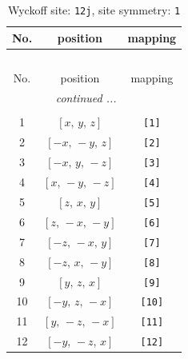 \documentclass[fleqn,8pt]{jsarticle}
\begin{document}
\begin{longtable}{ccc}
\caption{Wyckoff site: {\tt 12j}, site symmetry: {\tt 1}}
 \\
 \hline \hline
No. & position & mapping \\ \hline \endfirsthead

\multicolumn{2}{l}{\tablename\ \thetable{}} \\
 \hline \hline
No. & position & mapping \\ \hline \endhead

 \hline \hline
\multicolumn{2}{r}{\footnotesize\it continued ...} \\ \endfoot

 \hline \hline
\multicolumn{2}{r}{} \\ \endlastfoot

1 & $\left[ x,\, y,\, z \right]$ & {\tt [1]} \\ \hline
2 & $\left[ - x,\, - y,\, z \right]$ & {\tt [2]} \\ \hline
3 & $\left[ - x,\, y,\, - z \right]$ & {\tt [3]} \\ \hline
4 & $\left[ x,\, - y,\, - z \right]$ & {\tt [4]} \\ \hline
5 & $\left[ z,\, x,\, y \right]$ & {\tt [5]} \\ \hline
6 & $\left[ z,\, - x,\, - y \right]$ & {\tt [6]} \\ \hline
7 & $\left[ - z,\, - x,\, y \right]$ & {\tt [7]} \\ \hline
8 & $\left[ - z,\, x,\, - y \right]$ & {\tt [8]} \\ \hline
9 & $\left[ y,\, z,\, x \right]$ & {\tt [9]} \\ \hline
10 & $\left[ - y,\, z,\, - x \right]$ & {\tt [10]} \\ \hline
11 & $\left[ y,\, - z,\, - x \right]$ & {\tt [11]} \\ \hline
12 & $\left[ - y,\, - z,\, x \right]$ & {\tt [12]} \\
\end{longtable}
\end{document}
